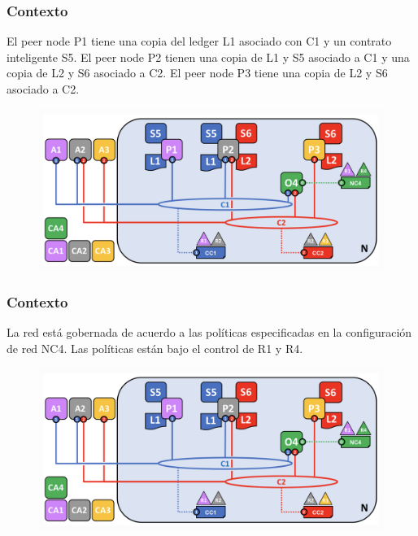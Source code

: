 \documentclass{beamer}
\begin{document}
	\begin{frame}
		\frametitle{Contexto}
		El peer node P1 tiene una copia del ledger L1 asociado con C1 y un contrato inteligente S5. El peer node P2 tienen una copia de L1 y S5 asociado a C1 y una copia de L2 y S6 asociado a C2. El peer node P3 tiene una copia de L2 y S6 asociado a C2.
		\begin{figure}[h]
			\includegraphics[scale=.3]{start_01}
			\centering
		\end{figure}
	\end{frame}
	
	\begin{frame}
		\frametitle{Contexto}
		La red está gobernada de acuerdo a las políticas especificadas en la configuración de red NC4. Las políticas están bajo el control de R1 y R4.
		\begin{figure}[h]
			\includegraphics[scale=.3]{start_01}
			\centering
		\end{figure}
	\end{frame}
\end{document}

